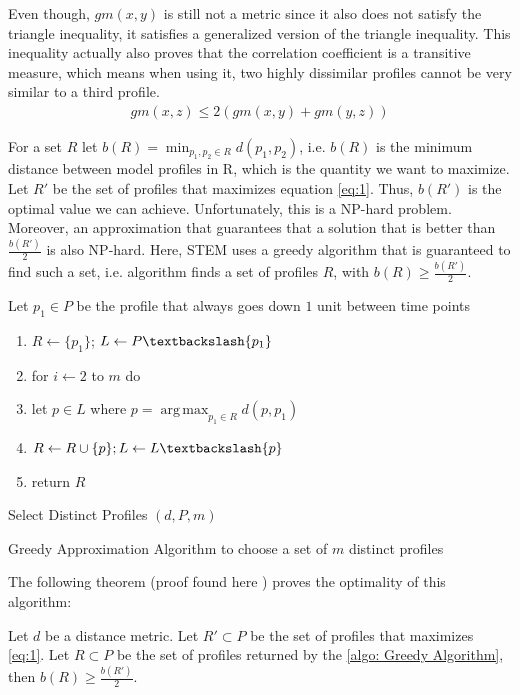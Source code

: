 Even though, $gm(x,y)$ is still not a metric since it also does not satisfy the triangle inequality, it satisfies a generalized version of the triangle inequality. This inequality actually also proves that the correlation coefficient is a transitive measure, which means when using it, two highly dissimilar profiles cannot be very similar to a third profile.
\begin{align*}
gm(x,z) \leq 2(gm(x,y) + gm(y,z))
\end{align*}

For a set $R$ let $b(R) = \operatorname{min}_{p_1,p_2\in R}d(p_1,p_2)$, i.e. $b(R)$ is the minimum distance between model profiles in R, which is the quantity we want to maximize. Let $R'$ be the set of profiles that maximizes equation \ref{eq:1}. Thus, $b(R')$ is the optimal value we can achieve. Unfortunately, this is a NP-hard problem. Moreover, an approximation that guarantees that a solution that is better than $\frac{b(R')}{2}$ is also NP-hard. Here, STEM uses a greedy algorithm that is guaranteed to find such a set, i.e. algorithm finds a set of profiles $R$, with $b(R) \geq \frac{b(R')}{2}$.
\begin{table}[H]
		\renewcommand{\arraystretch}{0.5}
	{\LinesNumberedHidden
		\begin{algorithm}[H]
			 Let $p_1 \in P$ be the profile that always goes down $1$ unit between time points
			\begin{enumerate}
				\item $R \leftarrow \{p_1\}$; $L \leftarrow P \textbackslash \{p_1\}$
				\item for $i \leftarrow 2$ to $m$ do 
				\item let $p \in L$ where $p = \operatorname*{arg\,max}_{p_1 \in R}d(p,p_1)$
						\item $R \leftarrow R\cup \{p\}; L \leftarrow L \textbackslash \{p\}$ 
				\item return $R$								
			\end{enumerate}
\caption{Select Distinct Profiles $(d,P,m)$}
	\end{algorithm}}
\caption{Greedy Approximation Algorithm to choose a set of $m$ distinct profiles}
\label{algo: Greedy Algorithm}
\end{table}
The following theorem (proof found here \cite{Ernst2005}) proves the optimality of this algorithm:
\begin{theorem}
	Let $d$ be a distance metric. Let $R' \subset P$ be the set of profiles that maximizes \ref{eq:1}. Let $R \subset P$ be the set of profiles returned by the \autoref{algo: Greedy Algorithm}, then $b(R) \geq \frac{b(R')}{2}$.
\end{theorem}

